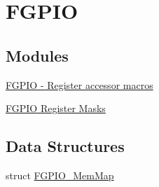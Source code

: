 \hypertarget{group___f_g_p_i_o___peripheral}{}\section{F\+G\+P\+IO}
\label{group___f_g_p_i_o___peripheral}
\subsection*{Modules}
\begin{DoxyCompactItemize}
\item 
\hyperlink{group___f_g_p_i_o___register___accessor___macros}{F\+G\+P\+I\+O -\/ Register accessor macros}
\item 
\hyperlink{group___f_g_p_i_o___register___masks}{F\+G\+P\+I\+O Register Masks}
\end{DoxyCompactItemize}
\subsection*{Data Structures}
\begin{DoxyCompactItemize}
\item 
struct \hyperlink{struct_f_g_p_i_o___mem_map}{F\+G\+P\+I\+O\+\_\+\+Mem\+Map}
\end{DoxyCompactItemize}
